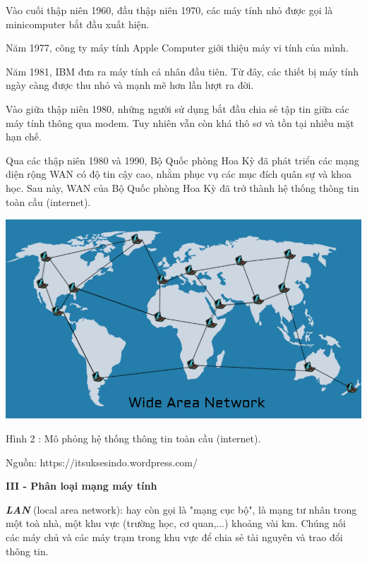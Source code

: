 \documentclass{report}
\begin{document}
\smallskip
\setlength{\parindent}{1cm}
Vào cuối thập niên 1960, đầu thập niên 1970, các máy tính nhỏ được gọi là minicomputer bắt đầu xuất hiện.

\smallskip
Năm 1977, công ty máy tính Apple Computer giới thiệu máy vi tính của mình.

\smallskip
Năm 1981, IBM đưa ra máy tính cá nhân đầu tiên. Từ đây, các thiết bị máy tính ngày càng được thu nhỏ và mạnh mẽ hơn lần lượt ra đời.

\smallskip
Vào giữa thập niên 1980, những người sử dụng bắt đầu chia sẻ tập tin giữa các máy tính thông qua modem. Tuy nhiên vẫn còn khá thô sơ và tồn tại nhiều mặt hạn chế.

\smallskip
Qua các thập niên 1980 và 1990, Bộ Quốc phòng Hoa Kỳ đã phát triển các mạng diện rộng WAN có độ tin cậy cao, nhằm phục vụ các mục đích quân sự và khoa học. Sau này, WAN của Bộ Quốc phòng Hoa Kỳ đã trở thành hệ thống thông tin toàn cầu (internet).



\begin{center}
     \includegraphics[scale=0.3]{WAN}
\end{center}
\centerline{Hình 2 : Mô phỏng hệ thống thông tin toàn cầu (internet).}
\changefontsizes{12pt}
\centerline{Nguồn: https://itsuksesindo.wordpress.com/}

\bigskip
\changefontsizes{14pt}
\setlength{\parindent}{0.2cm}
\textbf{III - Phân loại mạng máy tính}

\changefontsizes{13pt}
\bigskip
\setlength{\parindent}{0.2cm}
\textbf{\textit{LAN}} (local area network): hay còn gọi là "mạng cục bộ", là mạng tư nhân trong một toà nhà, một khu vực (trường học, cơ quan,...) khoảng vài km. Chúng nối các máy chủ và các máy trạm trong khu vực để chia sẻ tài nguyên và trao đổi thông tin.
\end{document}
